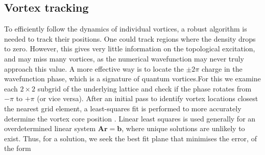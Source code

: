  \subsection{Vortex tracking}\label{sec:vortrack}
 To efficiently follow the dynamics of individual vortices, a robust algorithm is needed to track their positions. One could track regions where the density drops to zero. However, this gives very little information on the topological excitation, and may miss many vortices, as the numerical wavefunction may never truly approach this value. A more effective way is to locate the $\pm 2\pi$ charge in the wavefunction phase, which is a signature of quantum vortices.For this we examine each $2\times 2$ subgrid of the underlying lattice and check if the phase rotates from $-\pi$ to $+\pi$ (or vice versa). After an initial pass to identify vortex locations closest the nearest grid element, a least-squares fit is performed to more accurately determine the vortex core position \cite{c42f}. Linear least squares is used generally for an overdetermined linear system $\mathbf{A}\mathbf{r} = \mathbf{b}$, where unique solutions are unlikely to exist. Thus, for a solution, we seek the best fit plane that minimises the error, of the form

